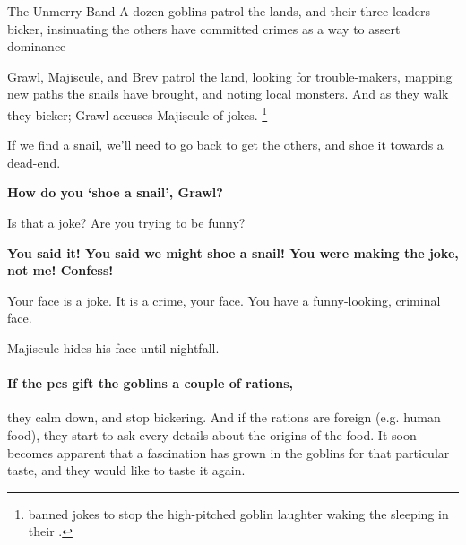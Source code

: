 {The Unmerry Band}%
{A dozen goblins patrol the lands, and their three leaders bicker, insinuating the others have committed crimes as a way to assert dominance}%

Grawl, Majiscule, and Brev patrol the land, looking for trouble-makers, mapping new paths the snails have brought, and noting local monsters.
And as they walk they bicker; Grawl accuses Majiscule of jokes.%
\footnote{ banned jokes to stop the high-pitched goblin laughter waking the  sleeping in their .}

\begin{speechtext}
  If we find a snail, we'll need to go back to get the others, and shoe it towards a dead-end.

  \textbf{How do you `shoe a snail', Grawl?}

  Is that a \underline{joke}?
  Are you trying to be \underline{funny}?

  \textbf{You said it!
  You said we might shoe a snail!
  You were making the joke, not me!
  Confess!}

  Your face is a joke.
  It is a crime, your face.
  You have a funny-looking, criminal face.
\end{speechtext}

Majiscule hides his face until nightfall.




\paragraph{If the \glspl{pc} gift the goblins a couple of \glspl{ration},}
they calm down, and stop bickering.
And if the \glspl{ration} are foreign (e.g. human food), they start to ask every details about the origins of the food.
It soon becomes apparent that a fascination has grown in the goblins for that particular taste, and they would like to taste it again.

